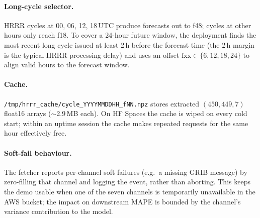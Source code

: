 \paragraph{Long-cycle selector.} HRRR cycles at 00, 06, 12, 18\,UTC produce forecasts out to f48; cycles at other hours only reach f18. To cover a 24-hour future window, the deployment finds the most recent long cycle issued at least 2\,h before the forecast time (the 2\,h margin is the typical HRRR processing delay) and uses an offset $\mathrm{fxx}\in\{6, 12, 18, 24\}$ to align valid hours to the forecast window.

\paragraph{Cache.} \texttt{/tmp/hrrr\_cache/{cycle\_YYYYMMDDHH}\_f{NN}.npz} stores extracted $(450, 449, 7)$ float16 arrays ($\sim$2.9\,MB each). On HF Spaces the cache is wiped on every cold start; within an uptime session the cache makes repeated requests for the same hour effectively free.

\paragraph{Soft-fail behaviour.} The fetcher reports per-channel soft failures (e.g.\ a missing GRIB message) by zero-filling that channel and logging the event, rather than aborting. This keeps the demo usable when one of the seven channels is temporarily unavailable in the AWS bucket; the impact on downstream MAPE is bounded by the channel's variance contribution to the model.
